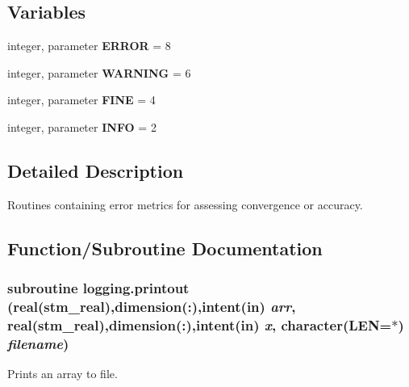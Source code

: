 \subsection*{Variables}
\begin{CompactItemize}
\item 
\hypertarget{a00065_4fef0f6770ed1a3369486cc7caf5e25f}{
integer, parameter \textbf{ERROR} = 8}
\label{a00065_4fef0f6770ed1a3369486cc7caf5e25f}

\item 
\hypertarget{a00065_9e21cb84ee3460e169e066caefc941c5}{
integer, parameter \textbf{WARNING} = 6}
\label{a00065_9e21cb84ee3460e169e066caefc941c5}

\item 
\hypertarget{a00065_666ddbe52c6b318d1c0b438f9e77f9c9}{
integer, parameter \textbf{FINE} = 4}
\label{a00065_666ddbe52c6b318d1c0b438f9e77f9c9}

\item 
\hypertarget{a00065_1f768521de3cb528027c76c14b2452fb}{
integer, parameter \textbf{INFO} = 2}
\label{a00065_1f768521de3cb528027c76c14b2452fb}

\end{CompactItemize}


\subsection{Detailed Description}
Routines containing error metrics for assessing convergence or accuracy. 



\subsection{Function/Subroutine Documentation}
\hypertarget{a00065_edbe5e4dde2de733c331141c3d226c59}{
\subsubsection[{printout}]{\setlength{\rightskip}{0pt plus 5cm}subroutine logging.printout (real(stm\_\-real),dimension(:),intent(in) {\em arr}, \/  real(stm\_\-real),dimension(:),intent(in) {\em x}, \/  character(LEN=$\ast$) {\em filename})}}
\label{a00065_edbe5e4dde2de733c331141c3d226c59}


Prints an array to file. 

